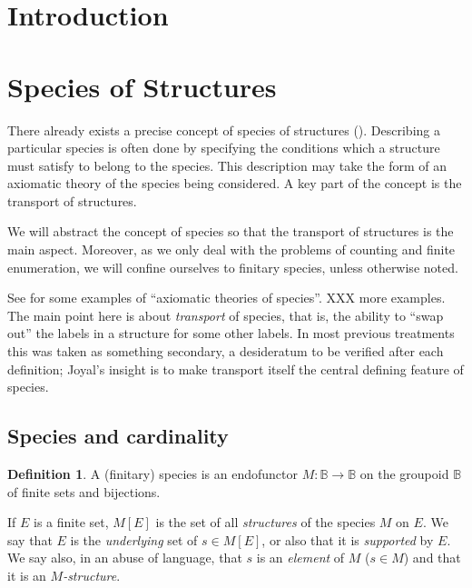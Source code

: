\documentclass{article}
\theoremstyle{definition}
\newtheorem{defn}[thm]{Definition}
\theoremstyle{remark}
\newcommand{\B}{\mathbb{B}}
\newcommand{\term}[1]{\emph{#1}}
\begin{document}
\section{Introduction}
\label{sec:introduction}


\section{Species of Structures}
\label{sec:species-of-structures}

There already exists a precise concept of species of structures (). Describing a particular species is often done by specifying the
conditions which a structure must satisfy to belong to the species.
This description may take the form of an axiomatic theory of the species
being considered. A key part of the concept is the transport of structures.

We will abstract the concept of species so that the transport of
structures is the main aspect. Moreover, as we only deal
with the problems of counting and finite enumeration, we will confine ourselves
to finitary species, unless otherwise noted.

\begin{commentary}
  See \citet[pp. 4 XXX]{BLL} for some examples of ``axiomatic theories
  of species''.  XXX more examples.  The main point here is about
  \emph{transport} of species, that is, the ability to ``swap out''
  the labels in a structure for some other labels.  In most previous
  treatments this was taken as something secondary, a desideratum to
  be verified after each definition; Joyal's insight is to make
  transport itself the central defining feature of species.
\end{commentary}

\subsection{Species and cardinality}
\label{sec:species-and-cardinality}

\begin{defn}
  A (finitary) species is an endofunctor $M: \B \to \B$
  on the groupoid $\B$ of finite sets and bijections.
\end{defn}

If $E$ is a finite set, $M [E]$ is the set of all \term{structures} of
the species $M$ on $E$. We say that $E$ is the \term{underlying} set
of $s \in M[E]$, or also that it is \term{supported} by $E$. We say
also, in an abuse of language, that $s$ is an \term{element} of $M$
($s \in M$) and that it is an \term{$M$-structure}.
\end{document}
